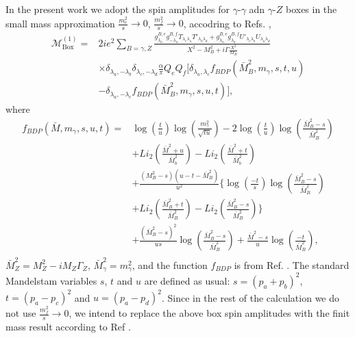 In the present work we adopt the spin amplitudes for $\gamma$-$\gamma$ adn $\gamma$-$Z$ boxes in the small mass approximation $\frac{m^2_e}{s}\to 0$, $\frac{m_f^2}{s}\to 0 $, accodring to Refs. \cite{WasPol,box},
\begin{align}
\mathcal{M}^{(1)}_\text{Box}=&2ie^2\sum_{B=\gamma,Z}\frac{g_{\lambda_a}^{B,e}g_{-\lambda_a}^{B,f}T_{\lambda_c\lambda_a}T'_{\lambda_b\lambda_d}+g_{\lambda_a}^{B,e}g_{\lambda_a}^{B,f}U'_{\lambda_c\lambda_b}U_{\lambda_a\lambda_d}}{X^2-M_B^2+i\Gamma\frac{X^2}{M_B}}\nonumber\\
&\times\delta_{\lambda_a,-\lambda_b}\delta_{\lambda_c,-\lambda_d}\frac{\alpha}{\pi}Q_eQ_f[\delta_{\lambda_a,\lambda_c}f_{BDP}(\bar{M}^2_B,m_\gamma,s,t,u)\nonumber\\
&-\delta_{\lambda_a,-\lambda_c}f_{BDP}(\bar{M}^2_B,m_\gamma,s,u,t)],
\end{align}
where
\begin{align}
f_{BDP}(\bar{M},m_\gamma,s,u,t)=&\log\left(\frac{t}{u}\right)\log\left(\frac{m^2_\gamma}{\sqrt{tu}}\right)-2\log\left(\frac{t}{u}\right)\log\left(\frac{\bar{M}^2_B-s}{\bar{M}^2_B}\right)\nonumber\\
&+Li_2\left(\frac{\bar{M}^2+u}{\bar{M}^2_b}\right)-Li_2\left(\frac{\bar{M}^2+t}{\bar{M}^2_b}\right)\nonumber\\
&+\frac{(M^2_B-s)(u-t-\bar{M}_B^2)}{u^2}\biggl\{ \log\left(\frac{-t}{s}\right)\log\left(\frac{\bar{M}^2_B-s}{\bar{M}^2_B}\right)\nonumber\\
&+Li_2\left(\frac{\bar{M}^2_B+t}{\bar{M}^2_B}\right)-Li_2\left(\frac{\bar{M}^2_B-s}{\bar{M}^2_B}\right) \biggr\}\nonumber\\
&+\frac{(\bar{M}^2_B-s)^2}{us}\log\left(\frac{\bar{M}^2_B-s}{\bar{M}_B^2}\right)+\frac{\bar{M}^2-s}{u}\log\left(\frac{-t}{\bar{M}^2_B}\right),\nonumber\\
\end{align}
$\bar{M}^2_Z=M^2_Z-iM_Z\Gamma_Z$, $\bar{M}^2_\gamma=m^2_\gamma$, and the function $f_{BDP}$ is from Ref. \cite{box}. The standard Mandelstam variables $s$, $t$ and $u$ are defined as usual: $s=(p_a+p_b)^2$, $t=(p_a-p_c)^2$ and $u=(p_a-p_d)^2$. Since in the rest of the calculation we do not use $\frac{m_f^2}{s}\to0$, we intend to replace the above box spin amplitudes with the finit mass result according to Ref \cite{JW85}. 

